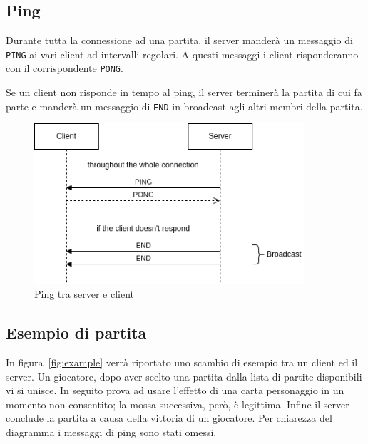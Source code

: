 \documentclass[a4paper,12pt]{article}
\begin{document}
\subsection{Ping}

Durante tutta la connessione ad una partita, il server manderà un messaggio
di \texttt{PING} ai vari client ad intervalli regolari. A questi messaggi i
client risponderanno con il corrispondente \texttt{PONG}.

Se un client non risponde in tempo al ping, il server terminerà la partita
di cui fa parte e manderà un messaggio di \texttt{END} in broadcast agli
altri membri della partita.

\begin{figure}[htb]
  \centering
  \includegraphics[width=10cm]{ping.png}
  \caption{Ping tra server e client}%
  \label{fig:ping}
\end{figure}

\subsection{Esempio di partita}

In figura~\ref{fig:example} verrà riportato uno scambio di esempio tra un
client ed il server. Un giocatore, dopo aver scelto una partita dalla lista
di partite disponibili vi si unisce. In seguito prova ad usare l'effetto di
una carta personaggio in un momento non consentito; la mossa successiva,
però, è legittima. Infine il server conclude la partita a causa della
vittoria di un giocatore. Per chiarezza del diagramma i messaggi di ping
sono stati omessi.
\end{document}
